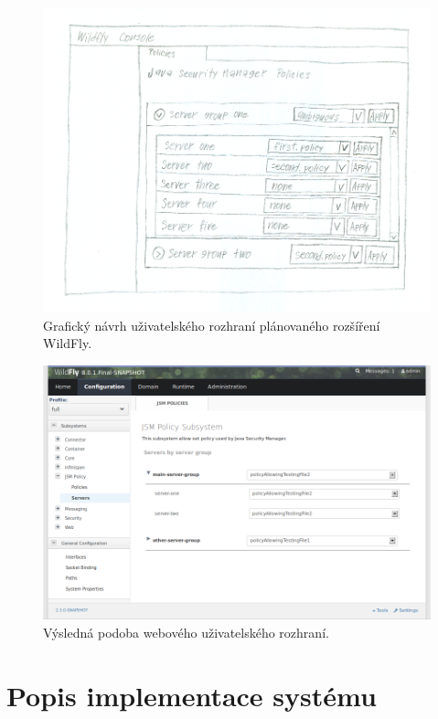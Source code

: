 \begin{figure}[ht]
  \centering
  \includegraphics[width=14cm]{fig/mockup}
  \caption{Grafický návrh uživatelského rozhraní plánovaného rozšíření WildFly.}
  \label{navrhGui}
\end{figure}

\begin{figure}[ht]
  \centering
  \includegraphics[width=14cm]{fig/jsmpolicy-servers}
  \caption{Výsledná podoba webového uživatelského rozhraní.}
  \label{vysledneGui}
\end{figure}

\chapter{Popis implementace systému} \label{implementace}

